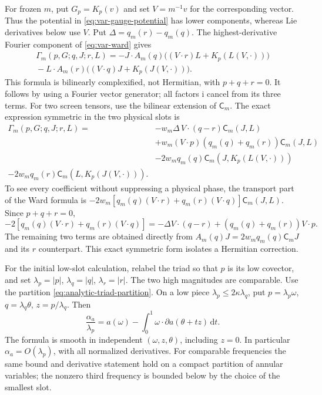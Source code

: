 \documentclass[11pt,a4paper]{article}
\numberwithin{equation}{section}
\newcommand{\dd}{\mathrm d}
\newcommand{\f}[2]{\frac{#1}{#2}}
\newcommand{\ii}{\mathrm{i}}
\theoremstyle{definition}
\begin{document}
For frozen $m$, put $G_p=K_p(v)$ and set $V=m^{-1}v$ for the
corresponding vector. Thus the potential in
\eqref{eq:var-gauge-potential} has lower components, whereas Lie
derivatives below use $V$. Put $\Delta=q_m(r)-q_m(q)$. The highest-derivative Fourier component of
\eqref{eq:var-ward} gives
\begin{equation*}
\begin{split}
\Gamma_m(p,G;q,J;r,L)=-J\cdot A_m(q)
 \bigl((V\cdot r)L+K_p(L(V,\cdot))\bigr)\\
{}-L\cdot A_m(r)
 \bigl((V\cdot q)J+K_p(J(V,\cdot))\bigr).
\end{split}
\end{equation*}
This formula is bilinearly complexified, not Hermitian, with
$p+q+r=0$. It follows by using a Fourier vector generator; all factors
$\ii$ cancel from its three terms. For two screen tensors, use the bilinear extension of $\mathsf C_m$. The exact expression
symmetric in the two physical slots is
\begin{equation}\label{eq:var-low-gauge-identity}
\begin{split}
\Gamma_m(p,G;q,J;r,L)
={}&-w_m\Delta\,V\cdot(q-r)\mathsf C_m(J,L)\\
&+w_m(V\cdot p)(q_m(q)+q_m(r))\mathsf C_m(J,L)\\
&-2w_mq_m(q)\mathsf C_m(J,K_p(L(V,\cdot)))\\
 -2w_mq_m(r)\mathsf C_m(L,K_p(J(V,\cdot))).
\end{split}
\end{equation}
To see every coefficient without suppressing a physical phase, the
transport part of the Ward formula is
$-2w_m[q_m(q)(V\cdot r)+q_m(r)(V\cdot q)]\mathsf C_m(J,L)$. Since $p+q+r=0$,
\begin{equation*}
-2[q_m(q)(V\cdot r)+q_m(r)(V\cdot q)]
=-\Delta V\cdot(q-r)+(q_m(q)+q_m(r))V\cdot p.
\end{equation*}
The remaining two terms are obtained directly from
$A_m(q)J=2w_mq_m(q)\mathsf C_mJ$ and its $r$ counterpart.
This exact symmetric form isolates a Hermitian correction.

For the initial low-slot calculation, relabel the triad so that $p$ is
its low covector, and set
$\lambda_p=|p|$, $\lambda_q=|q|$, $\lambda_r=|r|$.
The two high magnitudes are comparable. Use the partition
\eqref{eq:analytic-triad-partition}. On a low piece $\lambda_p\leq2\kappa \lambda_q$,
put $p=\lambda_p\omega$, $q=\lambda_q\theta$, $z=p/\lambda_q$. Then
\begin{equation}\label{eq:var-cyclic-extension}
\f{\alpha_a}{\lambda_p}
=a(\omega)-\int_0^1\omega\cdot\partial a(\theta+tz)\,\dd t.
\end{equation}
The formula is smooth in independent $(\omega,z,\theta)$, including
$z=0$. In particular $\alpha_a=O(\lambda_p)$, with all normalized derivatives.
For comparable frequencies the same bound and derivative statement
hold on a compact partition of annular variables; the nonzero third
frequency is bounded below by the choice of the smallest slot.
\end{document}
